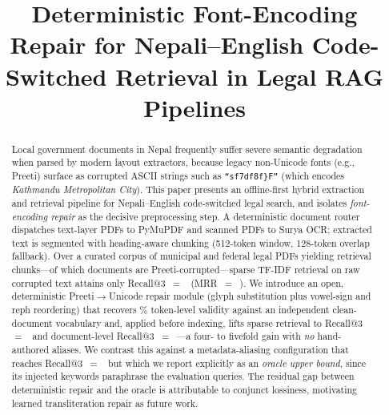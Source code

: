 \documentclass[conference]{IEEEtran}
\begin{document}
\title{Deterministic Font-Encoding Repair for Nepali--English Code-Switched Retrieval in Legal RAG Pipelines}

\author{
}

\maketitle

\begin{abstract}
Local government documents in Nepal frequently suffer severe semantic degradation when parsed by modern layout extractors, because legacy non-Unicode fonts (e.g., Preeti) surface as corrupted ASCII strings such as \texttt{``sf7df8f\}F''} (which encodes \emph{Kathmandu Metropolitan City}). This paper presents an offline-first hybrid extraction and retrieval pipeline for Nepali--English code-switched legal search, and isolates \emph{font-encoding repair} as the decisive preprocessing step. A deterministic document router dispatches text-layer PDFs to PyMuPDF and scanned PDFs to Surya OCR; extracted text is segmented with heading-aware chunking (512-token window, 128-token overlap fallback). Over a curated corpus of \corpusDocs{} municipal and federal legal PDFs yielding \corpusChunks{} retrieval chunks---of which \corpusCorruptDocs{} documents are Preeti-corrupted---sparse TF-IDF retrieval on raw corrupted text attains only Recall@3~$=$~\rawRecall{} (MRR~$=$~\rawMRR{}). We introduce an open, deterministic Preeti$\rightarrow$Unicode repair module (glyph substitution plus vowel-sign and reph reordering) that recovers \repairValidity{}\% token-level validity against an independent clean-document vocabulary and, applied before indexing, lifts sparse retrieval to Recall@3~$=$~\repRecall{} and document-level Recall@3~$=$~\repDocRecall{}---a four- to fivefold gain with \emph{no} hand-authored aliases. We contrast this against a metadata-aliasing configuration that reaches Recall@3~$=$~\aliRecall{} but which we report explicitly as an \emph{oracle upper bound}, since its injected keywords paraphrase the evaluation queries. The residual gap between deterministic repair and the oracle is attributable to conjunct lossiness, motivating learned transliteration repair as future work.
\end{abstract}
\end{document}
